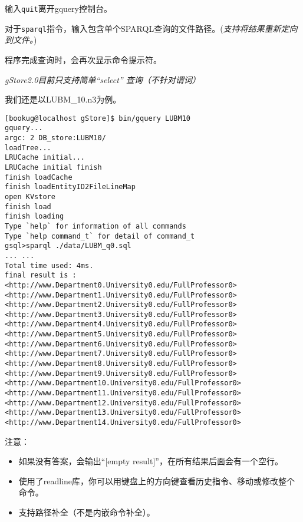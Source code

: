 \documentclass[titlepage, a4paper, 12pt]{article}
\begin{document}
输入\texttt{quit}离开gquery控制台。

对于\texttt{sparql}指令，输入包含单个SPARQL查询的文件路径。(\emph{支持将结果重新定向到文件。})

程序完成查询时，会再次显示命令提示符。

\emph{gStore2.0目前只支持简单``select'' 查询（不针对谓词）}

我们还是以LUBM\_10.n3为例。

\begin{verbatim}
[bookug@localhost gStore]$ bin/gquery LUBM10
gquery...
argc: 2 DB_store:LUBM10/
loadTree...
LRUCache initial...
LRUCache initial finish
finish loadCache
finish loadEntityID2FileLineMap
open KVstore
finish load
finish loading
Type `help` for information of all commands
Type `help command_t` for detail of command_t
gsql>sparql ./data/LUBM_q0.sql
... ...
Total time used: 4ms.
final result is :
<http://www.Department0.University0.edu/FullProfessor0>
<http://www.Department1.University0.edu/FullProfessor0>
<http://www.Department2.University0.edu/FullProfessor0>
<http://www.Department3.University0.edu/FullProfessor0>
<http://www.Department4.University0.edu/FullProfessor0>
<http://www.Department5.University0.edu/FullProfessor0>
<http://www.Department6.University0.edu/FullProfessor0>
<http://www.Department7.University0.edu/FullProfessor0>
<http://www.Department8.University0.edu/FullProfessor0>
<http://www.Department9.University0.edu/FullProfessor0>
<http://www.Department10.University0.edu/FullProfessor0>
<http://www.Department11.University0.edu/FullProfessor0>
<http://www.Department12.University0.edu/FullProfessor0>
<http://www.Department13.University0.edu/FullProfessor0>
<http://www.Department14.University0.edu/FullProfessor0>
\end{verbatim}

注意：

\begin{itemize}
	\item
	如果没有答案，会输出``{[}empty result{]}''，在所有结果后面会有一个空行。
	\item
	使用了readline库，你可以用键盘上的方向键查看历史指令、移动或修改整个命令。
	\item
	支持路径补全（不是内嵌命令补全）。
\end{itemize}

\end{document}
